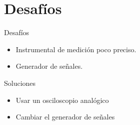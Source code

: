 \section{Desafíos}
\begin{frame}{Desafíos}
  \begin{itemize}
    \item Instrumental de medición poco preciso.
    \item Generador de señales.
  \end{itemize}
\end{frame}

\begin{frame}{Soluciones}
  \begin{itemize}
    \item Usar un osciloscopio analógico
    \item Cambiar el generador de señales
  \end{itemize}
\end{frame}

